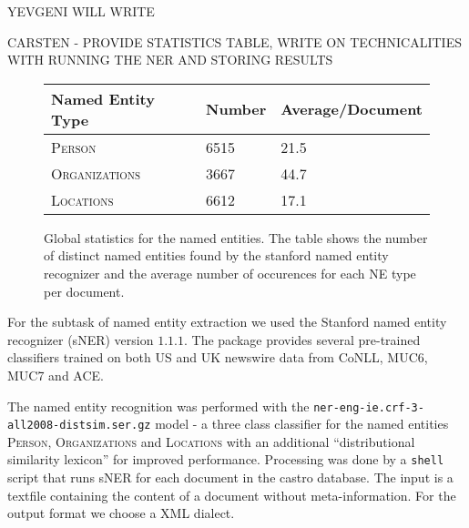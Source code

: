 
YEVGENI WILL WRITE

CARSTEN - PROVIDE STATISTICS TABLE, WRITE ON TECHNICALITIES WITH RUNNING THE NER AND STORING RESULTS
\begin{figure}[ht]
\centering
\caption{Global statistics for the named entities. The table shows the number of distinct named
entities found by the stanford named entity recognizer and the average number of occurences for
each NE type per document.}
\begin{tabular}{l|ll}
  Named Entity Type      & Number & Average/Document\\
  \hline
  \textsc{Person}        & 6515   & 21.5\\
  \textsc{Organizations} & 3667   & 44.7\\
  \textsc{Locations}     & 6612   & 17.1\\
\end{tabular}
\label{fig:ne_statistics}
\end{figure}

For the subtask of named entity extraction we used the Stanford named entity recognizer (sNER)
\cite{sner} version $1.1.1$. The package provides several pre-trained classifiers trained on both US
and UK newswire data from CoNLL, MUC6, MUC7 and ACE.

The named entity recognition was performed with the
\texttt{ner-eng-ie.crf-3-all2008-distsim.ser.gz} model - a three class classifier for the named
entities \textsc{Person}, \textsc{Organizations} and \textsc{Locations} with an additional
``distributional similarity lexicon'' for improved performance. Processing was done by a
\texttt{shell} script that runs sNER for each document in the castro database. The input is a
textfile containing the content of a document without meta-information. For the output format we
choose a XML dialect.